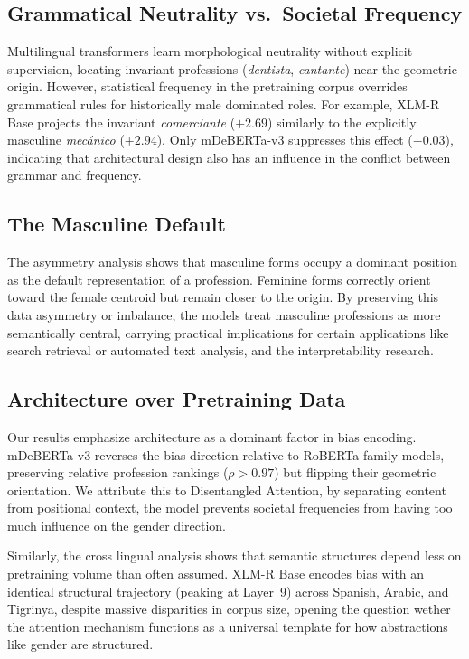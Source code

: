 \documentclass[english, a4paper, 11.5pt, twoside]{article}
\begin{document}
\subsection{Grammatical Neutrality vs.\ Societal Frequency}
Multilingual transformers learn morphological neutrality without explicit supervision, locating invariant professions (\textit{dentista}, \textit{cantante}) near the geometric origin. However, statistical frequency in the pretraining corpus overrides grammatical rules for historically male dominated roles. For example, XLM-R Base projects the invariant \textit{comerciante} ($+2.69$) similarly to the explicitly masculine \textit{mecánico} ($+2.94$). Only mDeBERTa-v3 suppresses this effect ($-0.03$), indicating that architectural design also has an influence in the conflict between grammar and frequency.

\subsection{The Masculine Default}
The asymmetry analysis shows that masculine forms occupy a dominant position as the default representation of a profession. Feminine forms correctly orient toward the female centroid but remain closer to the origin. By preserving this data asymmetry or imbalance, the models treat masculine professions as more semantically central, carrying practical implications for certain applications like search retrieval or automated text analysis, and the interpretability research.

\subsection{Architecture over Pretraining Data}
Our results emphasize architecture as a dominant factor in bias encoding. mDeBERTa-v3 reverses the bias direction relative to RoBERTa family models, preserving relative profession rankings ($\rho > 0.97$) but flipping their geometric orientation. We attribute this to Disentangled Attention, by separating content from positional context, the model prevents societal frequencies from having too much influence on the gender direction.

Similarly, the cross lingual analysis shows that semantic structures depend less on pretraining volume than often assumed. XLM-R Base encodes bias with an identical structural trajectory (peaking at Layer~9) across Spanish, Arabic, and Tigrinya, despite massive disparities in corpus size, opening the question wether the attention mechanism functions as a universal template for how abstractions like gender are structured.
\end{document}
